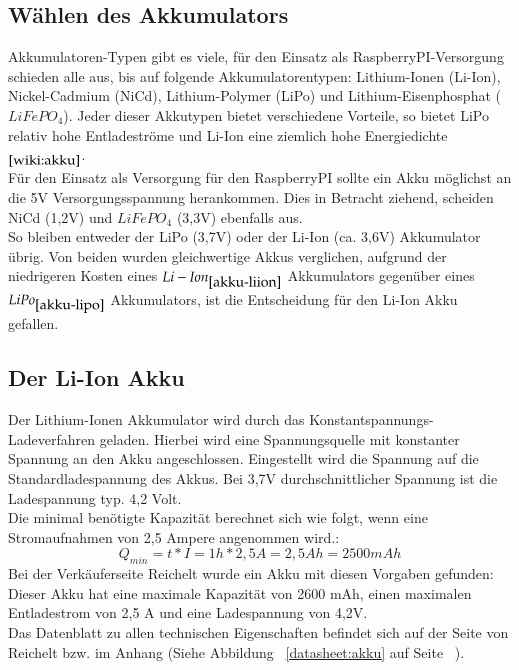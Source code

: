 \documentclass[12pt,a4paper]{article}
\begin{document}
\subsection{Wählen des Akkumulators}
\label{SUBSEC:CHOOSE-AKKU}

Akkumulatoren-Typen gibt es viele, für den Einsatz als RaspberryPI-Versorgung schieden alle aus, bis auf folgende Akkumulatorentypen: Lithium-Ionen (Li-Ion), Nickel-Cadmium (NiCd),  Lithium-Polymer (LiPo) und Lithium-Eisenphosphat ($LiFePO_4$). Jeder dieser Akkutypen bietet verschiedene Vorteile, so bietet LiPo relativ hohe Entladeströme und Li-Ion eine ziemlich hohe Energiedichte $_{\cite{wiki:akku}}$. \\
Für den Einsatz als Versorgung für den RaspberryPI sollte ein Akku möglichst an die 5V Versorgungsspannung herankommen. Dies in Betracht ziehend, scheiden NiCd (1,2V) und $LiFePO_4$ (3,3V) ebenfalls aus. \\
So bleiben entweder der LiPo (3,7V) oder der Li-Ion (ca. 3,6V) Akkumulator übrig. Von beiden wurden gleichwertige Akkus verglichen, aufgrund der niedrigeren Kosten eines $Li-Ion_{\cite{akku-liion}}$ Akkumulators gegenüber eines $LiPo_{\cite{akku-lipo}}$ Akkumulators, ist die Entscheidung für den Li-Ion Akku gefallen.

\subsection{Der Li-Ion Akku}
\label{SUBSEC:LIION}

Der Lithium-Ionen Akkumulator wird durch das Konstantspannungs-Ladeverfahren geladen. Hierbei wird eine Spannungsquelle mit konstanter Spannung an den Akku angeschlossen. Eingestellt wird die Spannung auf die Standardladespannung des Akkus. Bei 3,7V durchschnittlicher Spannung ist die Ladespannung typ. 4,2 Volt. \\
Die minimal benötigte Kapazität berechnet sich wie folgt, wenn eine Stromaufnahmen von 2,5 Ampere angenommen wird.:
\[Q_{min} = t*I = 1h * 2,5A = 2,5 Ah = 2500 mAh\]
Bei der Verkäuferseite Reichelt wurde ein Akku mit diesen Vorgaben gefunden: \cite{akku-liion}\\
Dieser Akku hat eine maximale Kapazität von 2600 mAh, einen maximalen Entladestrom von 2,5 A und eine Ladespannung von 4,2V. \\[1ex]
Das Datenblatt zu allen technischen Eigenschaften befindet sich auf der Seite von Reichelt \cite{akku-liion} bzw. im Anhang (Siehe Abbildung ~\ref{datasheet:akku} auf Seite ~\pageref{datasheet:akku}).
\end{document}
